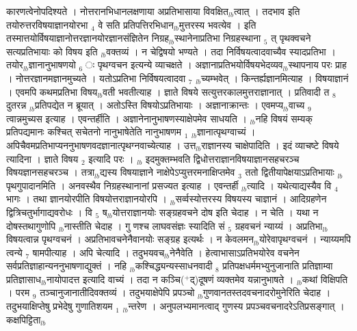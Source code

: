 \documentclass[article,12pt,a4paper]{memoir}%
\newcommand{\add}[1]{($^{+}$#1)}
\begin{document}
कारणत्वेनोपदिश्यते । नोत्तरानभिधानलक्षणाया अप्रतिभासाया विवक्षित{\tiny $_{lb}$}त्वात् । तदभाव इति तयोरुत्तरविषयाज्ञानयोरभा {\tiny $_{4}$} वे सति प्रतिपत्तिरभिधान{\tiny $_{lb}$}मुत्तरस्य भवत्येव । इति तस्मात्तयोर्विषयाज्ञानोत्तरज्ञानयोरज्ञानसंज्ञितेन निग्रह{\tiny $_{lb}$}स्थानेनाप्रतिभा निग्रहस्थाना {\tiny $_{5}$} त् पृथक्वचने सत्यप्रतिभायाः को विषय इति {\tiny $_{lb}$}वक्तव्यं । न चेद्विषयो भण्यते । तदा निर्विषयत्वादवाच्यैव स्यादप्रतिभा । तयोर{\tiny $_{lb}$}ज्ञानानुभाषणयो {\tiny $_{6}$} ः पृथग्वचन इत्यन्ये व्याचक्षते । अज्ञानाप्रतिभयोर्विषयभेदव्यव{\tiny $_{lb}$}स्थापनाय परः प्राह । नोत्तरज्ञानमज्ञानमुच्यते । यतोऽप्रतिभा निर्विषयत्वादवा {\tiny $_{7}$} {\tiny $_{lb}$}च्यम्भवेत् । किन्तर्ह्यज्ञानमित्याह । विषयाज्ञानं । एवमपि कथमप्रतिभा विषय{\tiny $_{lb}$}वती भवतीत्याह । {\color{DodgerBlue3}ज्ञाते विषये} सत्युत्तरकालमुत्तराज्ञानात् । प्रतिवादी त {\tiny $_{8}$} दुतरन्न {\tiny $_{lb}$}प्रतिपद्येत न ब्रूयात् । अतोऽस्ति विषयोऽप्रतिभायाः । अज्ञानाक्रान्तः । एवमप्य{\tiny $_{lb}$}वाच्य {\tiny $_{9}$} \leavevmode{} त्वान्नमुच्यस इत्याह । {\color{DodgerBlue3}एवन्तर्हीति} । अज्ञानेनानुभाषणस्याक्षेपमेव साधयति । {\tiny $_{lb}$}नहि विषयं सम्यक् प्रतिपद्यमानः कश्चित् सचेतनो नानुभाषेतेति नानुभाषणम {\tiny $_{1}$} {\tiny $_{lb}$}ज्ञानात्पृथग्वाच्यं । अपिचैवमप्रतिभाप्यननुभाषणवदज्ञानात्पृथग्नवाच्येत्याह । {\color{DodgerBlue3}उत्त{\tiny $_{lb}$}राज्ञानस्य चाक्षेपादिति} । इदं व्याचष्टे {\color{DodgerBlue3}विषये} त्यादिना । ज्ञाते विषय {\tiny $_{2}$} इत्यादि परः । {\tiny $_{lb}$}  \leavevmode{} इदमुक्तम्भवति द्विधोत्तराज्ञानविषयाज्ञानसहचरञ्च विषयज्ञानसहचरञ्च । तत्रा{\tiny $_{lb}$}द्यस्य विषयाज्ञाने नाक्षेपेऽप्युत्तरमनाक्षिप्तमेव {\tiny $_{3}$} ततो द्वितीयापेक्षयाऽप्रतिभायाः {\tiny $_{lb}$}पृथगुपादानमिति । अनवस्थैव निग्रहस्थानानां प्रसज्यत इत्याह । {\color{DodgerBlue3}एवन्तर्ही} {\tiny $_{lb}$}त्यादि । यथेत्याद्यस्यैव वि {\tiny $_{4}$} भागः । तथा ज्ञानयोरपीति विषयोत्तराज्ञानयोरपि । {\tiny $_{lb}$}सर्व्वस्योत्तरस्य विषयस्य चाज्ञानं । आदिग्रहणेन द्वित्रिचतुर्भागाद्यवरोधः । वि {\tiny $_{5}$} ष{\tiny $_{lb}$}योत्तराज्ञानयोः सङ्ग्रहवचने दोष इति चेदाह । न चेति । यथा न दोषस्तथागुणोपि {\tiny $_{lb}$}नास्तीति चेदाह । गु {\color{DodgerBlue3}णश्च लाघवसंज्ञः} स्यादिति सं {\tiny $_{5}$} ग्रहवचनं न्याय्यं । अप्रतिभा{\tiny $_{lb}$}विषयत्वान्न पृथग्वचनं । अप्रतिभावचनेनैवानयोः सङ्ग्रह इत्यर्थः । न केवलमन{\tiny $_{lb}$}योरेवापृथग्वचनं । न्याय्यमपि त्वन्ये {\tiny $_{7}$} षामपीत्याह । {\color{DodgerBlue3}अपि चेत्यादि} । तदुभयवच{\tiny $_{lb}$}नेनैवेति । हेत्वाभासाऽप्रतिभयोरेव वचनेन सर्वप्रतिज्ञाहान्यननुभाषणाद्युक्तं । नहि {\tiny $_{lb}$}कश्चिद्ध्यन्यस्साधनवादी {\tiny $_{8}$} प्रतिपक्षधर्ममभ्युनुजानाति प्रतिज्ञाम्वा प्रतिज्ञासाध{\tiny $_{lb}$}नायोपादत्त इत्यादि वाच्यं । तदा न कञ्चि\add{द्}दूषणं व्यक्तमेव यन्नानुभाषते । {\tiny $_{lb}$}कथां विक्षिपति । परम {\tiny $_{9}$} \leavevmode{} तञ्चानुजानातीदिवक्तव्यं । तदुभयाक्षेपेपि प्रपञ्चो {\tiny $_{lb}$}गुणवानतस्तदवचनादरोमुनेरिति चेदाह । तदुभयाक्षिप्तेषु प्रभेदेषु गुणातिशयम {\tiny $_{1}$} {\tiny $_{lb}$}न्तरेण । अनुपलभ्यमानत्वाद् गुणस्य प्रपञ्चवचनादरेऽतिप्रसङ्गात् । कक्षपिट्टिता{\tiny $_{lb}$} 
\end{document}
